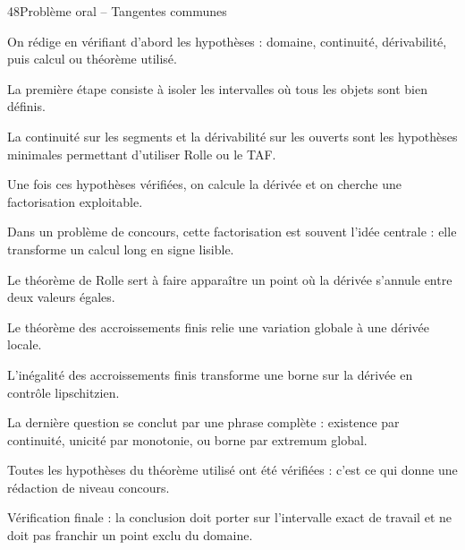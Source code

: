 \documentclass[11pt,a4paper]{article}
\begin{document}
\begin{corrbox}{48}{Problème oral -- Tangentes communes}

\begin{methodebox}
On rédige en vérifiant d'abord les hypothèses : domaine, continuité, dérivabilité, puis calcul ou théorème utilisé.
\end{methodebox}

La première étape consiste à isoler les intervalles où tous les objets sont bien définis.


La continuité sur les segments et la dérivabilité sur les ouverts sont les hypothèses minimales permettant d'utiliser Rolle ou le TAF.


Une fois ces hypothèses vérifiées, on calcule la dérivée et on cherche une factorisation exploitable.


Dans un problème de concours, cette factorisation est souvent l'idée centrale : elle transforme un calcul long en signe lisible.


Le théorème de Rolle sert à faire apparaître un point où la dérivée s'annule entre deux valeurs égales.


Le théorème des accroissements finis relie une variation globale à une dérivée locale.


L'inégalité des accroissements finis transforme une borne sur la dérivée en contrôle lipschitzien.


La dernière question se conclut par une phrase complète : existence par continuité, unicité par monotonie, ou borne par extremum global.


Toutes les hypothèses du théorème utilisé ont été vérifiées : c'est ce qui donne une rédaction de niveau concours.


\begin{attentionbox}
Vérification finale : la conclusion doit porter sur l'intervalle exact de travail et ne doit pas franchir un point exclu du domaine.
\end{attentionbox}

\end{corrbox}
\end{document}
